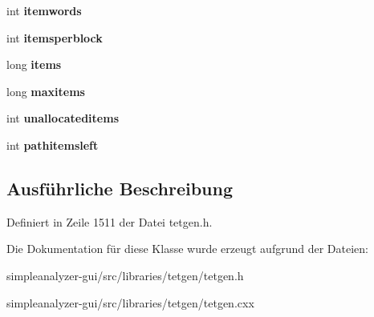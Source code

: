 \begin{DoxyCompactItemize}
\item 
\hypertarget{classtetgenmesh_1_1memorypool_a11a5e52e6559d7fcd95de844d69a37a4}{int {\bfseries itemwords}}\label{classtetgenmesh_1_1memorypool_a11a5e52e6559d7fcd95de844d69a37a4}

\item 
\hypertarget{classtetgenmesh_1_1memorypool_a06ef9dbd1dec025a8c0475aaac348d3a}{int {\bfseries itemsperblock}}\label{classtetgenmesh_1_1memorypool_a06ef9dbd1dec025a8c0475aaac348d3a}

\item 
\hypertarget{classtetgenmesh_1_1memorypool_af29a38b2654a8d977dd24eea8dc72729}{long {\bfseries items}}\label{classtetgenmesh_1_1memorypool_af29a38b2654a8d977dd24eea8dc72729}

\item 
\hypertarget{classtetgenmesh_1_1memorypool_ae9dda5bafe91eed206b26fa7d7020716}{long {\bfseries maxitems}}\label{classtetgenmesh_1_1memorypool_ae9dda5bafe91eed206b26fa7d7020716}

\item 
\hypertarget{classtetgenmesh_1_1memorypool_aa8a5667ab1f55ec7ef852d378871b9ee}{int {\bfseries unallocateditems}}\label{classtetgenmesh_1_1memorypool_aa8a5667ab1f55ec7ef852d378871b9ee}

\item 
\hypertarget{classtetgenmesh_1_1memorypool_ad83a51d49f6e03ff38151b870a2f51dd}{int {\bfseries pathitemsleft}}\label{classtetgenmesh_1_1memorypool_ad83a51d49f6e03ff38151b870a2f51dd}

\end{DoxyCompactItemize}


\subsection{Ausführliche Beschreibung}


Definiert in Zeile 1511 der Datei tetgen.\-h.



Die Dokumentation für diese Klasse wurde erzeugt aufgrund der Dateien\-:\begin{DoxyCompactItemize}
\item 
simpleanalyzer-\/gui/src/libraries/tetgen/tetgen.\-h\item 
simpleanalyzer-\/gui/src/libraries/tetgen/tetgen.\-cxx\end{DoxyCompactItemize}
